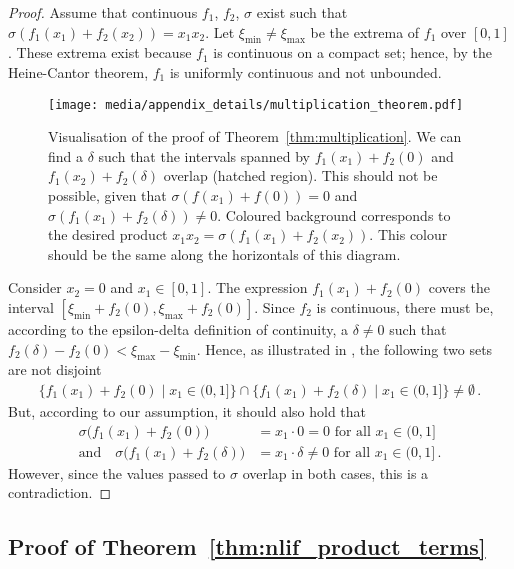 \begin{proof}
Assume that continuous $f_1$, $f_2$, $\sigma$ exist such that $\sigma(f_1(x_1) + f_2(x_2)) = x_1 x_2$.
Let $\xi_\mathrm{min} \neq \xi_\mathrm{max}$ be the extrema of $f_1$ over $[0, 1]$.
These extrema exist because $f_1$ is continuous on a compact set; hence, by the Heine-Cantor theorem, $f_1$ is uniformly continuous and not unbounded.


\begin{figure}[t]
	\texttt{[image: media/appendix\_details/multiplication\_theorem.pdf]}
	\caption[Visualisation of the proof of Theorem~\ref{thm:multiplication}]{Visualisation of the proof of Theorem~\ref{thm:multiplication}.
	We can find a $\delta$ such that the intervals spanned by $f_1(x_1) + f_2(0)$ and $f_1(x_2) + f_2(\delta)$ overlap (hatched region).
	This should not be possible, given that $\sigma(f(x_1) + f(0)) = 0$ and $\sigma(f_1(x_1) + f_2(\delta)) \neq 0$.
	Coloured background corresponds to the desired product $x_1 x_2 = \sigma(f_1(x_1) + f_2(x_2))$.
	This colour should be the same along the horizontals of this diagram.}
	\label{fig:multiplication_theorem}
\end{figure}

Consider $x_2 = 0$ and $x_1 \in [0, 1]$.
The expression $f_1(x_1) + f_2(0)$ covers the interval $[\xi_\mathrm{min} + f_2(0) , \xi_\mathrm{max} + f_2(0)]$.
Since $f_2$ is continuous, there must be, according to the epsilon-delta definition of continuity, a $\delta \neq 0$ such that $f_2(\delta) - f_2(0) < \xi_\mathrm{max} - \xi_\mathrm{min}$.
Hence, as illustrated in , the following two sets are not disjoint
\begin{align*}
	\bigl\{ f_1(x_1) + f_2(0) \mid x_1 \in (0, 1] \bigr\} \cap \bigl\{ f_1(x_1) + f_2(\delta) \mid x_1 \in (0, 1] \bigr\} \neq \emptyset \,.
\end{align*}
But, according to our assumption, it should also hold that
\begin{align*}
	\sigma\bigl(f_1(x_1) + f_2(0)\bigr) &= x_1 \cdot 0 = 0 \text{ for all } x_1 \in (0, 1] \\
	\text{and} \quad \sigma\bigl(f_1(x_1) + f_2(\delta)\bigr) &= x_1 \cdot \delta \neq 0 \text{ for all } x_1 \in (0, 1] \,.
\end{align*}
However, since the values passed to $\sigma$ overlap in both cases, this is a contradiction. \Lightning
\end{proof}


\subsection{Proof of Theorem~\ref{thm:nlif_product_terms}}
\label{app:nlif_product_terms}

